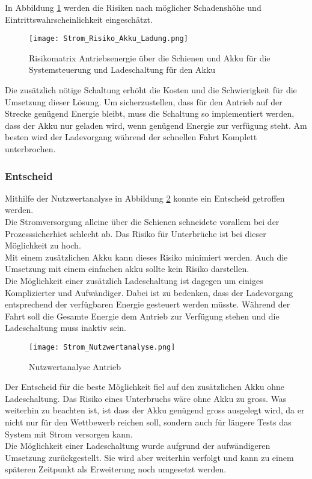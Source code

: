 \documentclass[../../main.tex]{subfiles}
\begin{document}
    In Abbildung \ref{fig:strom_risikomatrix_akku_mitladung} werden die Risiken nach möglicher Schadenshöhe und Eintrittswahrscheinlichkeit eingeschätzt.

    \begin{figure}[H]
        \centering
        \texttt{[image: Strom\_Risiko\_Akku\_Ladung.png]}
        \caption {Risikomatrix Antriebsenergie über die Schienen und Akku für die Systemsteuerung und Ladeschaltung für den Akku}
        \label{fig:strom_risikomatrix_akku_mitladung}
    \end{figure}

    Die zusätzlich nötige Schaltung erhöht die Kosten und die Schwierigkeit für die Umsetzung dieser Lösung. Um sicherzustellen, dass für den Antrieb auf der Strecke genügend Energie bleibt, muss die Schaltung so implementiert werden, dass der Akku nur geladen wird, wenn genügend Energie zur verfügung steht. Am besten wird der Ladevorgang während der schnellen Fahrt Komplett unterbrochen.

    
    \subsubsection{Entscheid}
    Mithilfe der Nutzwertanalyse in Abbildung \ref{fig:strom_nutzwertanalyse} konnte ein Entscheid getroffen werden.\\
    Die Stromversorgung alleine über die Schienen schneidete vorallem bei der Prozesssicherhiet schlecht ab. Das Risiko für Unterbrüche ist bei dieser Möglichkeit zu hoch.\\
    Mit einem zusätzlichen Akku kann dieses Risiko  minimiert werden. Auch die Umsetzung mit einem einfachen akku sollte kein Risiko darstellen.\\
    Die Möglichkeit einer zusätzlich Ladeschaltung ist dagegen um einiges Komplizierter und Aufwändiger. Dabei ist zu bedenken, dass der Ladevorgang entsprechend der verfügbaren Energie gesteuert werden müsste. Während der Fahrt soll die Gesamte Energie dem Antrieb zur Verfügung stehen und die Ladeschaltung muss inaktiv sein.
        
    \begin{figure}[H]
        \centering
        \texttt{[image: Strom\_Nutzwertanalyse.png]}
        \caption {Nutzwertanalyse Antrieb}
        \label{fig:strom_nutzwertanalyse}
    \end{figure}

    Der Entscheid für die beste Möglichkeit fiel auf den zusätzlichen Akku ohne Ladeschaltung. Das Risiko eines Unterbruchs wäre ohne Akku zu gross. Was weiterhin zu beachten ist, ist dass der Akku genügend gross ausgelegt wird, da er nicht nur für den Wettbewerb reichen soll, sondern auch für längere Tests das System mit Strom versorgen kann.\\ 
    Die Möglichkeit einer Ladeschaltung wurde aufgrund der aufwändigeren Umsetzung zurückgestellt. Sie wird aber weiterhin verfolgt und kann zu einem späteren Zeitpunkt als Erweiterung noch umgesetzt werden.
    


    
\end{document}
